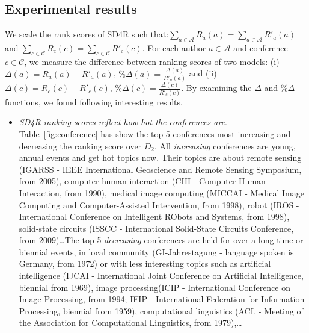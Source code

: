 \documentclass[lnicst]{svmultln}
\begin{document}
\subsection{Experimental results}
 We scale the rank scores of SD4R such that:$\sum_{a \in \mathcal{A}} R_a(a) = \sum_{a \in \mathcal{A}} R'_a(a)$ and  $\sum_{c \in \mathcal{C}} R_c(c) = \sum_{c \in \mathcal{C}} R'_c(c)$. For each author $a \in \mathcal{A}$ and conference $c\in \mathcal{C}$, we measure the difference between ranking scores of two models: (i)$\Delta (a)= R_a(a) - R'_a(a)$, $\%\Delta (a)= \frac{\Delta(a)}{R'_a(a)}$ and (ii)$\Delta (c)= R_c(c) - R'_c(c)$, $\%\Delta (c)= \frac{\Delta(c)}{R'_c(c)}$. By examining the $\Delta$ and  $\%\Delta$ functions, we found following interesting results.   
\begin{itemize}
\item \textit{SD4R ranking scores reflect how hot the conferences are}. Table~\ref{fig:conference} has show the top 5 conferences most increasing and decreasing the ranking score over $D_2$. All \textit{increasing} conferences are young, annual events and get hot topics now. Their topics are about remote sensing (IGARSS - IEEE International Geoscience and Remote Sensing Symposium, from 2005), computer human interaction (CHI - Computer Human Interaction, from 1990), medical image computing (MICCAI - Medical Image Computing and Computer-Assisted Intervention, from 1998), robot (IROS - International Conference on Intelligent RObots and Systems, from 1998), solid-state circuits (ISSCC - International Solid-State Circuits Conference, from 2009)\ldots The top 5 \textit{decreasing} conferences are held for over a long time or biennial events, in local community (GI-Jahrestagung - language spoken is Germany, from 1972) or with less interesting topics such as artificial intelligence (IJCAI -  International Joint Conference on Artificial Intelligence, biennial from 1969), image processing(ICIP - International Conference on Image Processing, from 1994; IFIP - International Federation for Information Processing, biennial from 1959), computational linguistics (ACL - Meeting of the Association for Computational Linguistics, from 1979),\ldots   



\end{itemize}
\end{document}
